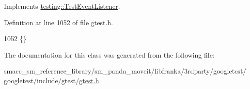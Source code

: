 Implements \hyperlink{classtesting_1_1TestEventListener_ab4f6a0ca16ae75daf385b3b5914e1048}{testing\+::\+Test\+Event\+Listener}.



Definition at line 1052 of file gtest.\+h.


\begin{DoxyCode}
1052 \{\}
\end{DoxyCode}


The documentation for this class was generated from the following file\+:\begin{DoxyCompactItemize}
\item 
smacc\+\_\+sm\+\_\+reference\+\_\+library/sm\+\_\+panda\+\_\+moveit/libfranka/3rdparty/googletest/googletest/include/gtest/\hyperlink{gtest_8h}{gtest.\+h}\end{DoxyCompactItemize}
